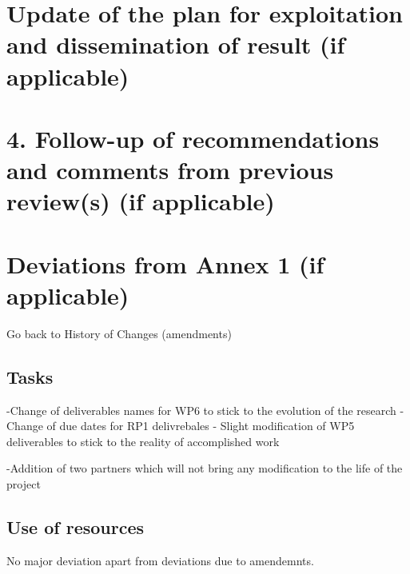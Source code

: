 \documentclass{deliverablereport}
\begin{document}
\begin{itemize}


\section{Update of the plan for exploitation and dissemination of result (if applicable)}



\section{4. Follow-up of recommendations and comments from previous review(s) (if applicable)}


\section{Deviations from Annex 1 (if applicable)}

Go back to History of Changes (amendments)

\subsection{Tasks}
-Change of deliverables names for WP6 to stick to the evolution of the research
-Change of due dates for RP1 delivrebales
- Slight modification of WP5 deliverables to stick to the reality of accomplished work

-Addition of two partners which will not bring any modification to the life of the project


\subsection{Use of resources}
No major deviation apart from deviations due to amendemnts. 


\end{itemize}
\end{document}
